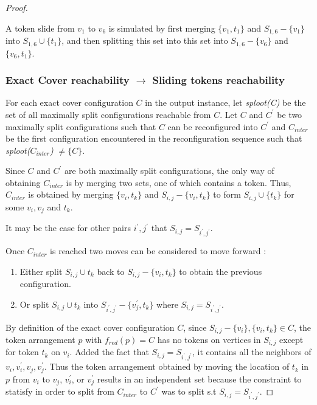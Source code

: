 \begin{proof}
\begin{example}A token slide from $v_1$ to $v_6$ is simulated by first merging $\{v_1, t_1\}$ and $S_{1,6} - \{v_1\}$ into $S_{1,6} \cup \{t_1\}$,
and then splitting this set into this set into $S_{1,6} - \{v_6\}$ and $\{v_6, t_1\}$.
\end{example}

\subsubsection{Exact Cover reachability $\rightarrow$ Sliding tokens reachability}\label{subsubsection:backward}

For each exact cover configuration $C$ in the output instance, let \textit{sploot(C)} be the set of all maximally split configurations reachable
from $C$. Let $C$ and $C^{'}$ be two maximally split configurations such that $C$ can be reconfigured into $C^{'}$ and $C_{inter}$ be the first
configuration encountered in the reconfiguration sequence such that \textit{sploot($C_{inter}$)} $\neq \{C\}$.

\begin{obs}
Since $C$ and $C^{'}$ are both maximally split configurations, the only way of obtaining $C_{inter}$ is by merging two sets, one of which contains
a token. Thus, $C_{inter}$ is obtained by merging $\{v_i, t_k\}$ and $S_{i,j} - \{v_i, t_k\}$  to form $S_{i,j} \cup \{t_k\}$ for
some $v_i, v_j$ and $t_k$.
\end{obs}

\begin{remark}
It may be the case for other pairs $i^{'}, j^{'}$ that $S_{i,j} = S_{i^{'}, j^{'}}$.
\end{remark}

Once $C_{inter}$ is reached two moves can be considered to move forward :
\begin{enumerate}
  \item Either split $S_{i,j} \cup t_k$ back to $S_{i,j} - \{v_i,t_k\}$ to obtain the previous configuration.
  \item Or split $S_{i,j} \cup t_k$ into $S_{i^{'},j^{'}} - \{v_j^{'},t_k\}$ where $S_{i,j} = S_{i^{'}, j^{'}}$.
\end{enumerate}

By definition of the exact cover configuration $C$, since $S_{i,j} - \{v_i\}, \{v_i, t_k\} \in C$, the token
arrangement $p$ with $f_{red}(p) = C$ has no tokens on vertices in $S_{i,j}$ except for token $t_k$ on $v_i$. Added the fact
that $S_{i,j} = S_{i^{'}, j^{'}}$, it contains all the neighbors of $v_i, v_i^{'}, v_j, v_j^{'}$. Thus the token
arrangement obtained by moving the location of $t_k$ in $p$ from $v_i$ to $v_j$, $v_i^{'}$, or $v_j^{'}$ results in an independent set because
the constraint to statisfy in order to split from $C_{inter}$ to $C^{'}$ was to split s.t $S_{i,j} = S_{i^{'}, j^{'}}$.


\end{proof}
